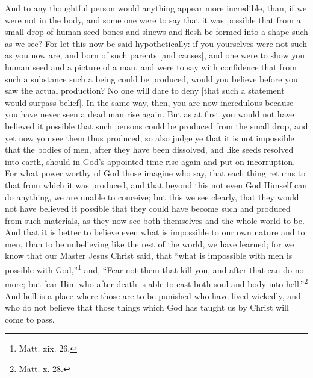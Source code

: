 
And to any thoughtful person would anything appear more incredible, than, if we were not in the body, and some one were to say that it was possible that from a small drop of human seed bones and sinews and flesh be formed into a shape such as we see? For let this now be said hypothetically: if you yourselves were not such as you now are, and born of such parents [and causes], and one were to show you human seed and a picture of a man, and were to say with confidence that from such a substance such a being could be produced, would you believe before you saw the actual production? No one will dare to deny [that such a statement would surpass belief]. In the same way, then, you are now incredulous because you have never seen a dead man rise again. But as at first you would not have believed it possible that such persons could be produced from the small drop, and yet now you see them thus produced, so also judge ye that it is not impossible that the bodies of men, after they have been dissolved, and like seeds resolved into earth, should in God’s appointed time rise again and put on incorruption. For what power worthy of God those imagine who say, that each thing returns to that from which it was produced, and that beyond this not even God Himself can do anything, we are unable to conceive; but this we see clearly, that they would not have believed it possible that they could have become such and produced from such materials, as they now see both themselves and the whole world to be. And that it is better to believe even what is impossible to our own nature and to men, than to be unbelieving like the rest of the world, we have learned; for we know that our Master Jesus Christ said, that “what is impossible with men is possible with God,”\footnote{Matt. xix. 26.} and, “Fear not them that kill you, and after that can do no more; but fear Him who after death is able to cast both soul and body into hell.”\footnote{Matt. x. 28.} And hell is a place where those are to be punished who have lived wickedly, and who do not believe that those things which God has taught us by Christ will come to pass.


